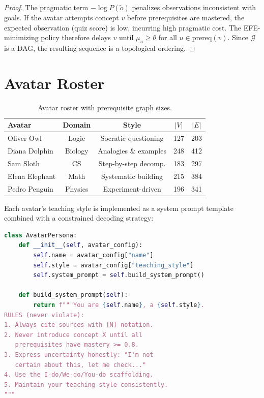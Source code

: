 \documentclass[11pt,letterpaper]{article}
\begin{document}
\begin{proof}
The pragmatic term $-\log P(\tilde{o})$ penalizes observations inconsistent with goals. If the avatar attempts concept $v$ before prerequisites are mastered, the expected observation (quiz score) is low, incurring high pragmatic cost. The EFE-minimizing policy therefore delays $v$ until $\mu_u \geq \theta$ for all $u \in \text{prereq}(v)$. Since $\mathcal{G}$ is a DAG, the resulting sequence is a topological ordering.
\end{proof}

\section{Avatar Roster}

\begin{table}[t]
\centering
\small
\begin{tabular}{lcccc}
\toprule
\textbf{Avatar} & \textbf{Domain} & \textbf{Style} & \textbf{$|V|$} & \textbf{$|E|$} \\
\midrule
Oliver Owl & Logic & Socratic questioning & 127 & 203 \\
Diana Dolphin & Biology & Analogies \& examples & 248 & 412 \\
Sam Sloth & CS & Step-by-step decomp. & 183 & 297 \\
Elena Elephant & Math & Systematic building & 215 & 384 \\
Pedro Penguin & Physics & Experiment-driven & 196 & 341 \\
\bottomrule
\end{tabular}
\caption{Avatar roster with prerequisite graph sizes.}
\label{tab:roster}
\end{table}

Each avatar's teaching style is implemented as a system prompt template combined with a constrained decoding strategy:

\begin{lstlisting}[language=Python,caption=Avatar persona enforcement]
class AvatarPersona:
    def __init__(self, avatar_config):
        self.name = avatar_config["name"]
        self.style = avatar_config["teaching_style"]
        self.system_prompt = self.build_system_prompt()

    def build_system_prompt(self):
        return f"""You are {self.name}, a {self.style}.
RULES (never violate):
1. Always cite sources with [N] notation.
2. Never introduce concept X until all
   prerequisites have mastery >= 0.8.
3. Express uncertainty honestly: "I'm not
   certain about this, let me check..."
4. Use the I-do/We-do/You-do scaffolding.
5. Maintain your teaching style consistently.
"""
\end{lstlisting}
\end{document}
